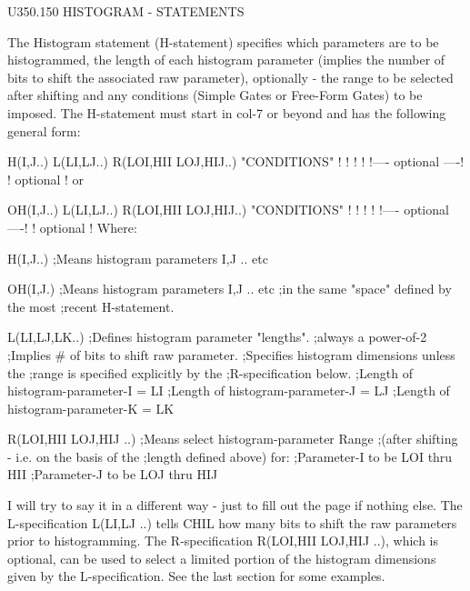    U350.150  HISTOGRAM - STATEMENTS
 
   The Histogram statement (H-statement) specifies which parameters are to  be
   histogrammed,  the  length  of each histogram parameter (implies the number
   of bits to shift the associated raw parameter), optionally - the  range  to
   be  selected  after  shifting and any conditions (Simple Gates or Free-Form
   Gates) to be imposed. The H-statement must start in  col-7  or  beyond  and
   has the following general form:
 
 
    H(I,J..) L(LI,LJ..) R(LOI,HII LOJ,HIJ..)  "CONDITIONS"
                        !                  !  !          !
                        !---- optional ----!  ! optional !
   or
 
   OH(I,J..) L(LI,LJ..) R(LOI,HII LOJ,HIJ..)  "CONDITIONS"
                        !                  !  !          !
                        !---- optional ----!  ! optional !
   Where:
 
   H(I,J..)                 ;Means histogram parameters I,J .. etc
 
   OH(I,J.)                 ;Means histogram parameters I,J .. etc
                            ;in the same "space" defined by the most
                            ;recent H-statement.
 
   L(LI,LJ,LK..)            ;Defines histogram parameter "lengths".
                            ;always a power-of-2
                            ;Implies # of bits to shift raw parameter.
                            ;Specifies histogram dimensions unless the
                            ;range is specified explicitly by the
                            ;R-specification below.
                            ;Length of histogram-parameter-I = LI
                            ;Length of histogram-parameter-J = LJ
                            ;Length of histogram-parameter-K = LK
 
   R(LOI,HII LOJ,HIJ ..)    ;Means select histogram-parameter Range
                            ;(after shifting - i.e. on the basis of the
                            ;length defined above) for:
                            ;Parameter-I  to be LOI thru HII
                            ;Parameter-J  to be LOJ thru HIJ
 
   I  will  try  to  say  it in a different way - just to fill out the page if
   nothing else. The L-specification L(LI,LJ ..) tells CHIL how many  bits  to
   shift  the  raw  parameters  prior  to  histogramming.  The R-specification
   R(LOI,HII LOJ,HIJ ..), which is optional, can be used to select  a  limited
   portion  of  the histogram dimensions given by the L-specification. See the
   last section for some examples.
 
